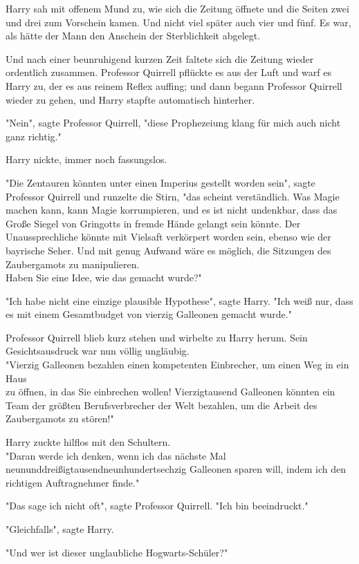 {Harry sah mit offenem Mund zu, wie sich die Zeitung öffnete und die Seiten zwei und drei zum Vorschein kamen. Und nicht viel später auch vier und fünf. Es war, als hätte der Mann den Anschein der Sterblichkeit abgelegt.

Und nach einer beunruhigend kurzen Zeit faltete sich die Zeitung wieder ordentlich zusammen. Professor Quirrell pflückte es aus der Luft und warf es Harry zu, der es aus reinem Reflex auffing; und dann begann Professor Quirrell wieder zu gehen, und Harry stapfte automatisch hinterher.

"Nein", sagte Professor Quirrell, "diese Prophezeiung klang für mich auch nicht ganz richtig."

Harry nickte, immer noch fassungslos.

"Die Zentauren könnten unter einen Imperius gestellt worden sein", sagte Professor Quirrell und runzelte die Stirn, "das scheint verständlich. Was Magie machen kann, kann Magie korrumpieren, und es ist nicht undenkbar, dass das Große Siegel von Gringotts in fremde Hände gelangt sein könnte. Der Unaussprechliche könnte mit Vielsaft verkörpert worden sein, ebenso wie der bayrische Seher. Und mit genug Aufwand wäre es möglich, die Sitzungen des Zaubergamots zu manipulieren.\\ Haben Sie eine Idee, wie das gemacht wurde?"

"Ich habe nicht eine einzige plausible Hypothese", sagte Harry. "Ich weiß nur, dass es mit einem Gesamtbudget von vierzig Galleonen gemacht wurde."

Professor Quirrell blieb kurz stehen und wirbelte zu Harry herum. Sein Gesichtsausdruck war nun völlig ungläubig.\\ "Vierzig Galleonen bezahlen einen kompetenten Einbrecher, um einen Weg in ein Haus\\ zu öffnen, in das Sie einbrechen wollen! Vierzigtausend Galleonen könnten ein Team der größten Berufsverbrecher der Welt bezahlen, um die Arbeit des Zaubergamots zu stören!"

Harry zuckte hilflos mit den Schultern.\\ "Daran werde ich denken, wenn ich das nächste Mal neununddreißigtausendneunhundertsechzig Galleonen sparen will, indem ich den richtigen Auftragnehmer finde."

"Das sage ich nicht oft", sagte Professor Quirrell. "Ich bin beeindruckt."

"Gleichfalls", sagte Harry.

"Und wer ist dieser unglaubliche Hogwarts-Schüler?"

}
